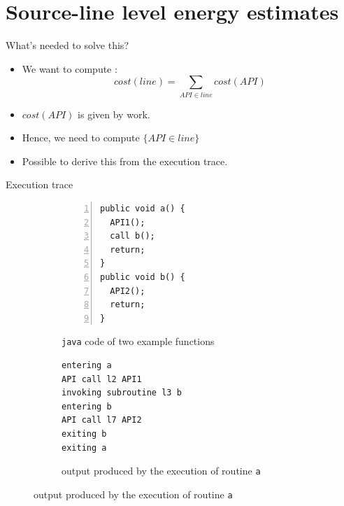 \section{Source-line level energy estimates}
%
%
\begin{frame}{What's needed to solve this?}
\begin{itemize}
\item We want to compute :
$$cost(line) = \sum_{API \in line} cost(API)$$
\item $cost(API)$ is given by \lv{} \cite{linares2014mining} work.
\item Hence, we need to compute $\{API \in line\}$
\item Possible to derive this from the execution trace.
\end{itemize}
\end{frame}  
%
%
\begin{frame}[fragile]{Execution trace}
\begin{figure}
\centering
%
\begin{subfigure}[t]{0.45\textwidth}
\caption{\texttt{java} code of two example functions}
\centering
\begin{lstlisting}[numbers=left]
public void a() {
  API1();
  call b();
  return;
}
public void b() {
  API2();
  return;
}
\end{lstlisting}
\end{subfigure}
%
\begin{subfigure}[t]{0.5\textwidth}
\centering
\caption{\logcat{} output produced by the execution of routine \texttt{a}}
\begin{lstlisting}
entering a
API call l2 API1
invoking subroutine l3 b
entering b
API call l7 API2
exiting b
exiting a
\end{lstlisting}
\label{fig:exlogcat3}
\end{subfigure}
\end{figure}
\end{frame}  
%
%
